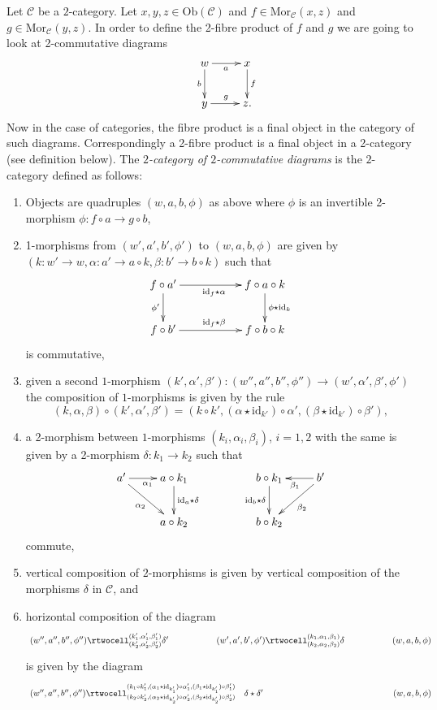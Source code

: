 \medskip\noindent
Let $\mathcal{C}$ be a $2$-category. Let $x, y, z\in \text{Ob}(\mathcal{C})$ and
$f\in \text{Mor}_{\mathcal{C}}(x, z)$ and $g\in \text{Mor}_{\mathcal C}(y, z)$.
In order to define the 2-fibre product of $f$ and $g$ we are going to look at
2-commutative diagrams
$$
\xymatrix{
&w \ar[r]_{a} \ar[d]_{b} & x \ar[d]^{f} \\
&y \ar[r]^{g} & z. }
$$
Now in the case of categories, the fibre product is a final object in the
category of such diagrams. Correspondingly a 2-fibre product is a final object
in a 2-category (see definition below). The {\it $2$-category
of $2$-commutative diagrams} is the $2$-category defined as follows:
\begin{enumerate}
\item Objects are quadruples $(w, a, b, \phi)$ as above where $\phi$
is an invertible 2-morphism $\phi : f \circ a \to g \circ b$,
\item 1-morphisms from $(w', a', b', \phi')$ to $(w, a, b, \phi)$ are given by
$(k : w' \to w, \alpha : a' \to a \circ k, \beta : b' \to b \circ k)$
such that
$$
\xymatrix{
f \circ a'
\ar[rr]_{\text{id}_f \star \alpha}
\ar[d]_{\phi'}
& &
f \circ a \circ k
\ar[d]^{\phi \star \text{id}_k}
\\
f \circ b'
\ar[rr]^{\text{id}_f \star \beta}
& &
f \circ b \circ k
}
$$
is commutative,
\item given a second $1$-morphism
$(k', \alpha', \beta') : (w'', a'', b'', \phi'') \to
(w', \alpha', \beta', \phi')$ the composition of $1$-morphisms
is given by the rule
$$
(k, \alpha, \beta) \circ (k', \alpha', \beta') =
(k \circ k',
(\alpha \star \text{id}_{k'}) \circ \alpha',
(\beta \star \text{id}_{k'}) \circ \beta'),
$$
\item a 2-morphism between $1$-morphisms
$(k_i, \alpha_i, \beta_i)$, $i = 1, 2$ with the same
is given by a 2-morphism $\delta : k_1 \to k_2$ such that
$$
\xymatrix{
a' 
\ar[rd]_{\alpha_2}
\ar[r]_{\alpha_1} &
a \circ k_1
\ar[d]^{\text{id}_a \star \delta} &
&
b \circ k_1
\ar[d]_{\text{id}_b \star \delta} &
b'
\ar[l]^{\beta_1}
\ar[ld]^{\beta_2}
\\
&
a \circ k_2
&
&
b \circ k_2
&
}
$$
commute,
\item vertical composition of $2$-morphisms is given by
vertical composition of the morphisms $\delta$ in $\mathcal{C}$, and
\item horizontal composition of the diagram
$$
\xymatrixcolsep{4pc}
\xymatrix{
(w'',a'',b'',\phi'')
\rtwocell^{(k'_1, \alpha'_1, \beta'_1)}_{(k'_2, \alpha'_2, \beta'_2)}{\delta'}
&
(w',a',b',\phi')
\rtwocell^{(k_1, \alpha_1, \beta_1)}_{(k_2, \alpha_2, \beta_2)}{\delta}
&
(w,a,b,\phi)
}
$$
is given by the diagram
$$
\xymatrixcolsep{12pc}
\xymatrix{
(w'',a'',b'',\phi'')
\rtwocell^{%
(k_1 \circ k'_1,
(\alpha_1 \star \text{id}_{k'_1}) \circ \alpha'_1,
(\beta_1 \star \text{id}_{k'_1}) \circ \beta'_1)}_{%
(k_2 \circ k'_2,
(\alpha_2 \star \text{id}_{k'_2}) \circ \alpha'_2,
(\beta_2 \star \text{id}_{k'_2}) \circ \beta'_2)}{\ \ \ \delta \star \delta'}
&
(w,a,b,\phi)
}
$$
\end{enumerate}
